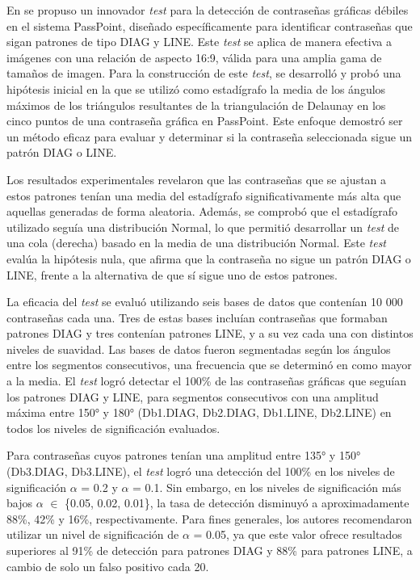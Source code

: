 \documentclass[12pt]{report}
\begin{document}

En \cite{13} se propuso un innovador \textit{test} para la detección de contraseñas gráficas débiles en el sistema PassPoint, diseñado específicamente para identificar contraseñas que sigan patrones de tipo DIAG y LINE. Este \textit{test} se aplica de manera efectiva a imágenes con una relación de aspecto 16:9, válida para una amplia gama de tamaños de imagen. Para la construcción de este \textit{test}, se desarrolló y probó una hipótesis inicial en la que se utilizó como estadígrafo la media de los ángulos máximos de los triángulos resultantes de la triangulación de Delaunay en los cinco puntos de una contraseña gráfica en PassPoint. Este enfoque demostró ser un método eficaz para evaluar y determinar si la contraseña seleccionada sigue un patrón DIAG o LINE.

Los resultados experimentales revelaron que las contraseñas que se ajustan a estos patrones tenían una media del estadígrafo significativamente más alta que aquellas generadas de forma aleatoria. Además, se comprobó que el estadígrafo utilizado seguía una distribución Normal, lo que permitió desarrollar un \textit{test} de una cola (derecha) basado en la media de una distribución Normal. Este \textit{test} evalúa la hipótesis nula, que afirma que la contraseña no sigue un patrón DIAG o LINE, frente a la alternativa de que sí sigue uno de estos patrones.

La eficacia del \textit{test} se evaluó utilizando seis bases de datos que contenían 10 000 contraseñas cada una. Tres de estas bases incluían contraseñas que formaban patrones DIAG y tres contenían patrones LINE, y a su vez cada una con distintos niveles de suavidad. Las bases de datos fueron segmentadas según los ángulos entre los segmentos consecutivos, una frecuencia que se determinó en \cite{5} como mayor a la media. El \textit{test} logró detectar el 100\% de las contraseñas gráficas que seguían los patrones DIAG y LINE, para segmentos consecutivos con una amplitud máxima entre 150° y 180° (Db1.DIAG, Db2.DIAG, Db1.LINE, Db2.LINE) en todos los niveles de significación evaluados.

Para contraseñas cuyos patrones tenían una amplitud entre 135° y 150° (Db3.DIAG, Db3.LINE), el \textit{test} logró una detección del 100\% en los niveles de significación $\alpha$ = 0.2 y $\alpha$ = 0.1. Sin embargo, en los niveles de significación más bajos  $\alpha$ $\in$ \{0.05, 0.02, 0.01\}, la tasa de detección disminuyó a aproximadamente 88\%, 42\% y 16\%, respectivamente. Para fines generales, los autores recomendaron  utilizar un nivel de significación de $\alpha$ = 0.05, ya que este valor ofrece resultados superiores al 91\% de detección para patrones DIAG y 88\% para patrones LINE, a cambio de solo un falso positivo cada 20.
\end{document}
